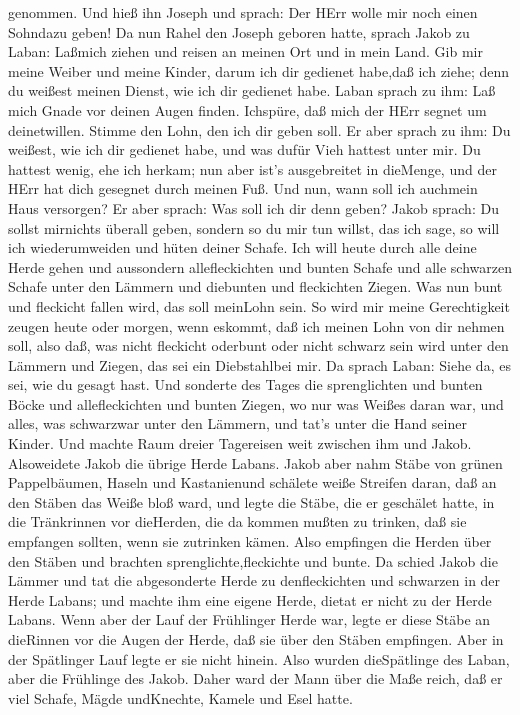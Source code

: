 genommen.  Und hieß ihn Joseph und sprach: Der HErr wolle
mir noch einen Sohndazu geben!  Da nun Rahel den Joseph
geboren hatte, sprach Jakob zu Laban: Laßmich ziehen und reisen an
meinen Ort und in mein Land.  Gib mir meine Weiber und
meine Kinder, darum ich dir gedienet habe,daß ich ziehe; denn du weißest
meinen Dienst, wie ich dir gedienet habe.  Laban sprach zu
ihm: Laß mich Gnade vor deinen Augen finden. Ichspüre, daß mich der HErr
segnet um deinetwillen.  Stimme den Lohn, den ich dir geben
soll.  Er aber sprach zu ihm: Du weißest, wie ich dir
gedienet habe, und was dufür Vieh hattest unter mir.  Du
hattest wenig, ehe ich herkam; nun aber ist's ausgebreitet in dieMenge,
und der HErr hat dich gesegnet durch meinen Fuß. Und nun, wann soll ich
auchmein Haus versorgen?  Er aber sprach: Was soll ich dir
denn geben? Jakob sprach: Du sollst mirnichts überall geben, sondern so
du mir tun willst, das ich sage, so will ich wiederumweiden und hüten
deiner Schafe.  Ich will heute durch alle deine Herde gehen
und aussondern allefleckichten und bunten Schafe und alle schwarzen
Schafe unter den Lämmern und diebunten und fleckichten Ziegen. Was nun
bunt und fleckicht fallen wird, das soll meinLohn sein.  So
wird mir meine Gerechtigkeit zeugen heute oder morgen, wenn eskommt, daß
ich meinen Lohn von dir nehmen soll, also daß, was nicht fleckicht
oderbunt oder nicht schwarz sein wird unter den Lämmern und Ziegen, das
sei ein Diebstahlbei mir.  Da sprach Laban: Siehe da, es
sei, wie du gesagt hast.  Und sonderte des Tages die
sprenglichten und bunten Böcke und allefleckichten und bunten Ziegen, wo
nur was Weißes daran war, und alles, was schwarzwar unter den Lämmern,
und tat's unter die Hand seiner Kinder.  Und machte Raum
dreier Tagereisen weit zwischen ihm und Jakob. Alsoweidete Jakob die
übrige Herde Labans.  Jakob aber nahm Stäbe von grünen
Pappelbäumen, Haseln und Kastanienund schälete weiße Streifen daran, daß
an den Stäben das Weiße bloß ward,  und legte die Stäbe,
die er geschälet hatte, in die Tränkrinnen vor dieHerden, die da kommen
mußten zu trinken, daß sie empfangen sollten, wenn sie zutrinken kämen.
 Also empfingen die Herden über den Stäben und brachten
sprenglichte,fleckichte und bunte.  Da schied Jakob die
Lämmer und tat die abgesonderte Herde zu denfleckichten und schwarzen in
der Herde Labans; und machte ihm eine eigene Herde, dietat er nicht zu
der Herde Labans.  Wenn aber der Lauf der Frühlinger Herde
war, legte er diese Stäbe an dieRinnen vor die Augen der Herde, daß sie
über den Stäben empfingen.  Aber in der Spätlinger Lauf
legte er sie nicht hinein. Also wurden dieSpätlinge des Laban, aber die
Frühlinge des Jakob.  Daher ward der Mann über die Maße
reich, daß er viel Schafe, Mägde undKnechte, Kamele und Esel hatte.

